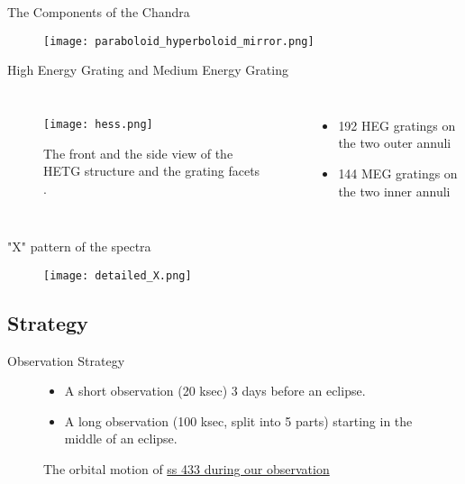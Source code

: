 \documentclass{beamer}
\begin{document}
\normalsize
\begin{frame}{The Components of the Chandra}
\begin{figure}
    \centering
    \texttt{[image: paraboloid\_hyperboloid\_mirror.png]}
    \label{mirror}
\end{figure}
\end{frame}

\begin{frame}{High Energy Grating and Medium Energy Grating}
       \begin{columns}
            \begin{figure}
                \centering
                \texttt{[image: hess.png]}
                \caption{The front and the side view of the HETG structure and the grating facets \citep{ChandraMSFC}.}
                \label{hess}               
                \end{figure}
          \begin{itemize}
              \item 192 HEG gratings on the two outer annuli
              \item 144 MEG gratings on the two inner annuli
          \end{itemize}
          \end{columns} 
\end{frame}

\begin{frame}{"X" pattern of the spectra}
    \begin{figure}
        \centering
        \texttt{[image: detailed\_X.png]}
        \label{xpattern}
    \end{figure}
\end{frame}

\subsection{Strategy}

\begin{frame}{Observation Strategy}
    \begin{figure}
    \centering
    \caption{The orbital motion of \href{http://dmaitra.webspace.wheatoncollege.edu/ss433_chandra_mjd.mp4}{ss 433 during our observation}}
    \label{binary}
    \begin{itemize}
        \item A short observation (20 ksec) 3 days before an eclipse.
        \item A long observation (100 ksec, split into 5 parts) starting in the middle of an eclipse.
    \end{itemize}
\end{figure}
    
\end{frame}
\end{document}
